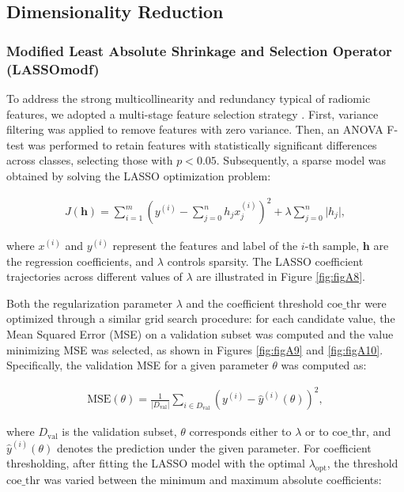 \subsection{Dimensionality Reduction}

\subsubsection{Modified Least Absolute Shrinkage and Selection Operator (LASSOmodf)}

To address the strong multicollinearity and redundancy typical of radiomic
features, we adopted a multi-stage feature selection strategy \cite{wang2023}.
First, variance filtering was applied to remove features with zero variance.
Then, an ANOVA F-test was performed to retain features with statistically
significant differences across classes, selecting those with \( p < 0.05 \).
Subsequently, a sparse model was obtained by solving the LASSO optimization
problem:

\begin{align}
	J(\mathbf{h}) = \sum_{i=1}^{m} \left( y^{(i)} - \sum_{j=0}^{n} h_j x^{(i)}_j \right)^2 + \lambda \sum_{j=0}^{n} \lvert h_j \rvert,
\end{align}

where \( x^{(i)} \) and \( y^{(i)} \) represent the features and label of the
\(i\)-th sample, \( \mathbf{h} \) are the regression coefficients, and \(
\lambda \) controls sparsity. The LASSO coefficient trajectories across
different values of \(\lambda\) are illustrated in Figure \ref{fig:figA8}.

Both the regularization parameter \(\lambda\) and the coefficient threshold
\(\text{coe\_thr}\) were optimized through a similar grid search procedure: for
each candidate value, the Mean Squared Error (MSE) on a validation subset was
computed and the value minimizing MSE was selected, as shown in Figures
\ref{fig:figA9} and \ref{fig:figA10}. Specifically, the validation MSE for a
given parameter \(\theta\) was computed as:

\begin{align}
	\text{MSE}(\theta) = \frac{1}{|D_{\text{val}}|} \sum_{i \in D_{\text{val}}}\left( y^{(i)} - \hat{y}^{(i)}(\theta) \right)^2,
\end{align}

where \(D_{\text{val}}\) is the validation subset, \(\theta\) corresponds
either to \(\lambda\) or to \(\text{coe\_thr}\), and \(\hat{y}^{(i)}(\theta)\)
denotes the prediction under the given parameter. For coefficient thresholding,
after fitting the LASSO model with the optimal \(\lambda_{\text{opt}}\), the
threshold \(\text{coe\_thr}\) was varied between the minimum and maximum
absolute coefficients:

